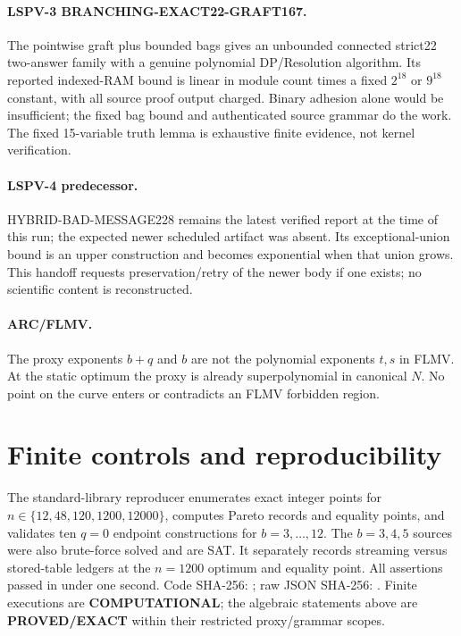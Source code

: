 \documentclass[11pt]{article}
\begin{document}
\paragraph{LSPV-3 BRANCHING-EXACT22-GRAFT167.}
The pointwise graft plus bounded bags gives an unbounded connected strict22
two-answer family with a genuine polynomial DP/Resolution algorithm.  Its
reported indexed-RAM bound is linear in module count times a fixed
$2^{18}$ or $9^{18}$ constant, with all source proof output charged.  Binary
adhesion alone would be insufficient; the fixed bag bound and authenticated
source grammar do the work.  The fixed 15-variable truth lemma is exhaustive
finite evidence, not kernel verification.

\paragraph{LSPV-4 predecessor.}
HYBRID-BAD-MESSAGE228 remains the latest verified report at the time of this
run; the expected newer scheduled artifact was absent.  Its exceptional-union
bound is an upper construction and becomes exponential when that union grows.
This handoff requests preservation/retry of the newer body if one exists; no
scientific content is reconstructed.

\paragraph{ARC/FLMV.}
The proxy exponents $b+q$ and $b$ are not the polynomial exponents $t,s$ in
FLMV.  At the static optimum the proxy is already superpolynomial in canonical
$N$.  No point on the curve enters or contradicts an FLMV forbidden region.

\section{Finite controls and reproducibility}
The standard-library reproducer
enumerates exact integer points for
$n\in\{12,48,120,1200,12000\}$, computes Pareto records and equality points,
and validates ten $q=0$ endpoint constructions for $b=3,\ldots,12$.
The $b=3,4,5$ sources were also brute-force solved and are SAT.  It separately
records streaming versus stored-table ledgers at the $n=1200$ optimum and
equality point.  All assertions passed in under one second.  Code SHA-256:
\texttt{};
raw JSON SHA-256:
\texttt{}.
Finite executions are \textbf{COMPUTATIONAL}; the algebraic statements above
are \textbf{PROVED/EXACT} within their restricted proxy/grammar scopes.
\end{document}
